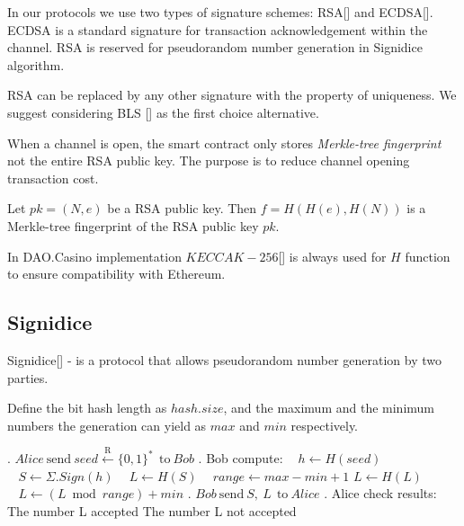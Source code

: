 In our protocols we use two types of signature schemes: RSA[] and ECDSA[]. ECDSA is a standard signature for transaction acknowledgement within the channel. RSA is reserved for pseudorandom number generation in Signidice algorithm.

\begin{remark}
RSA can be replaced by any other signature with the property of uniqueness. We suggest considering BLS [] as the first choice alternative.
\end{remark}

When a channel is open, the smart contract only stores \textit {Merkle-tree fingerprint} not the entire RSA public key. The purpose is to reduce channel opening transaction cost.

\begin{defn}
Let $pk = (N, e)$ be a RSA public key. Then $f = H(H(e), H(N))$ is a Merkle-tree fingerprint of the RSA public key $pk$. 
\end{defn}
\begin{remark}
In DAO.Casino implementation $KECCAK-256$[] is always used for $H$ function to ensure compatibility with Ethereum. 
\end{remark}

	\subsection{Signidice}

Signidice[] - is a protocol that allows pseudorandom number generation by two parties. 

Define the bit hash length as $hash.size$, and the maximum and the minimum numbers the generation can yield as $max$ and $ min$ respectively.

\begin{algorithm} 
\caption*{$\textbf{Signidice}$} \label{alg:signidice}
\begin{algorithmic}
. $ Alice \ \text{send}\  seed\xleftarrow{\text{R}} \{0,1\}^* \  \ \text{to} \ Bob$
. Bob compute:
\State $\ \ \ \ h \gets H(seed)$
\State $\ \ \ \ S \gets  \Sigma . Sign(h)$
\State $\ \ \ \ L \gets H(S) $
\State $\ \ \ \ range \gets max - min +1$
\State$ L \gets H(L)$
\EndWhile
\State $ \ \ \ \  L \gets (L \bmod range) + min $
. $Bob \ \text{send}\  S, \ L \ \   \text{to} \ Alice$
. Alice check results:
\State The number L accepted
\Else 
\State The number L not accepted
\EndIf
\end{algorithmic}
\end{algorithm}

